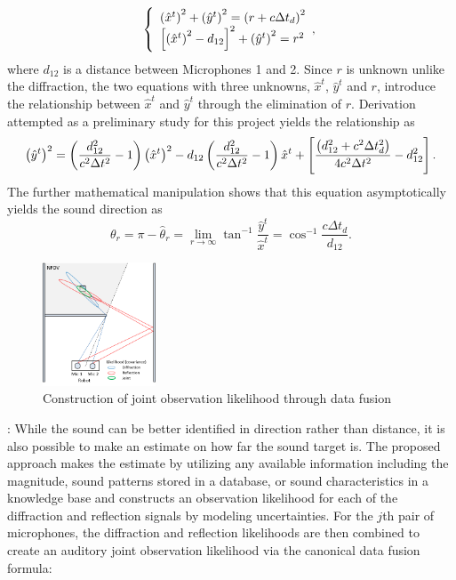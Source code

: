 \documentclass[letterpaper, 10 pt, conference]{ieeeconf}  %
\begin{document}
\begin{equation}\label{eq:reflection}
\left\{
\begin{array}{ll}
\left ( \hat x^t \right )^2 + \left ( \hat y^t \right )^2 = \left ( r + c \Delta t_d \right )^2\\
\left [ \left ( \hat x^t \right )^2 - d_{12} \right ]^2 + \left ( \hat y^t \right )^2 = r^2
\end{array},
\right.
\end{equation}
where $d_{12}$ is a distance between Microphones 1 and 2.  Since $r$ is unknown unlike the diffraction, the two equations with three unknowns, $\hat x^t$, $\hat y^t$ and $r$, introduce the relationship between $\hat x^t$ and $\hat y^t$ through the elimination of $r$.  Derivation attempted as a preliminary study for this project yields the relationship as
\begin{equation}\label{eq:estimation_reflection}
\left ( \hat y^t \right )^2 = \left ( \frac{d_{12}^2}{c^2 \Delta t^2} - 1 \right ) \left ( \hat x^t \right )^2 - d_{12} \left ( \frac{d_{12}^2}{c^2 \Delta t^2} - 1 \right ) \hat x^t + \left [ \frac{\left ( d_{12}^2 + c^2 \Delta t_d^2 \right )}{4 c^2 \Delta t^2} - d_{12}^2 \right ].  
\end{equation}
The further mathematical manipulation shows that this equation asymptotically yields the sound direction as 
\begin{equation}\label{eq:dirction_reflection}
\theta_r = \pi - \hat \theta_r = \lim_{r \rightarrow \infty} \tan^{-1} \frac{\hat y^t}{\hat x^t}= \cos^{-1} \frac{c \Delta t_d}{d_{12}}.   
\end{equation}
\begin{figure}[h]
	\centering
		\includegraphics[width=0.30\textwidth]{Figures/data_fusion.png}
	\caption{\footnotesize {Construction of joint observation likelihood through data fusion} }
	\label{fig:data_fusion}
\end{figure}
: 
While the sound can be better identified in direction rather than distance, it is also possible to make an estimate on how far the sound target is.  The proposed approach makes the estimate by utilizing any available information including the magnitude, sound patterns stored in a database, or sound characteristics in a knowledge base and constructs an observation likelihood for each of the diffraction and reflection signals by modeling uncertainties.  For the $j$th pair of microphones, the diffraction and reflection likelihoods are then combined to create an auditory joint observation likelihood via the canonical data fusion formula: 
\end{document}

